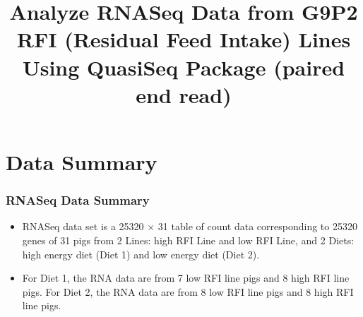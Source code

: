 \documentclass[handout,xcolor=pdftex,dvipsnames,table]{beamer}\usepackage[]{graphicx}\usepackage[]{color}
\title[RNASeq Analysis]{Analyze RNASeq Data from G9P2 RFI (Residual Feed Intake) Lines Using QuasiSeq Package (paired end read)}
\begin{document}
\frame{\maketitle}


\section{Data Summary}
\begin{frame}[fragile]
\frametitle{RNASeq Data Summary}
\begin{itemize}
\setlength{\itemsep}{.25in}
\item RNASeq data set is a  25320 $\times$ 31 table of count data  corresponding to 25320 genes of 31  pigs from 2 Lines: high RFI Line and low RFI Line, and 2 Diets: high energy diet (Diet 1) and low energy diet (Diet 2).

\item  For Diet 1, the RNA data are from 7 low RFI line pigs and 8  high RFI line pigs. 
For Diet 2, the RNA data are from 8 low RFI line pigs and 8  high RFI line pigs.
 
\end{itemize}
 

\end{frame}
\end{document}
